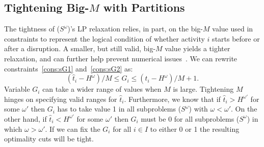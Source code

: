 \documentclass[11pt]{article}
\begin{document}
	\subsection{Tightening Big-\(M\) with Partitions} \label{subsec:tightenM}
	 The tightness of ($S^\omega$)'s LP relaxation relies, in part, on the big-$M$ value used in constraints to represent the logical condition of whether activity \(i\) starts before or after a disruption. A smaller, but still valid, big-\(M\) value yields a tighter relaxation, and can further help prevent numerical issues~\citep[e.g.,][]{camm1990cutting,klotz2013practical}. We can rewrite constraints~\eqref{cons:sG1} and~\eqref{cons:sG2} as:
	\begin{equation} \label{cons:Grange}
	(\hat{t}_i - H^\omega)/M \leq G_i \leq (\hat{t}_i - H^\omega)/M + 1.
	\end{equation}
	Variable \(G_i\) can take a wider range of values when \(M\) is large. Tightening \(M\) hinges on specifying valid ranges for \(\hat{t}_i\). Furthermore, we know that if \(\hat{t}_i > H^{\omega'}\) for some \(\omega'\) then \(G_i\) has to take value 1 in all subproblems ($S^\omega$) with \(\omega < \omega'\). On the other hand, if \(\hat{t}_i < H^{\omega'}\) for some \(\omega'\) then \(G_i\) must be 0  for all subproblems ($S^\omega$) in which \(\omega > \omega'\). If we can fix the \(G_i\) for all \(i \in I\) to either 0 or 1 the resulting optimality cuts will be tight.
	
\end{document}
